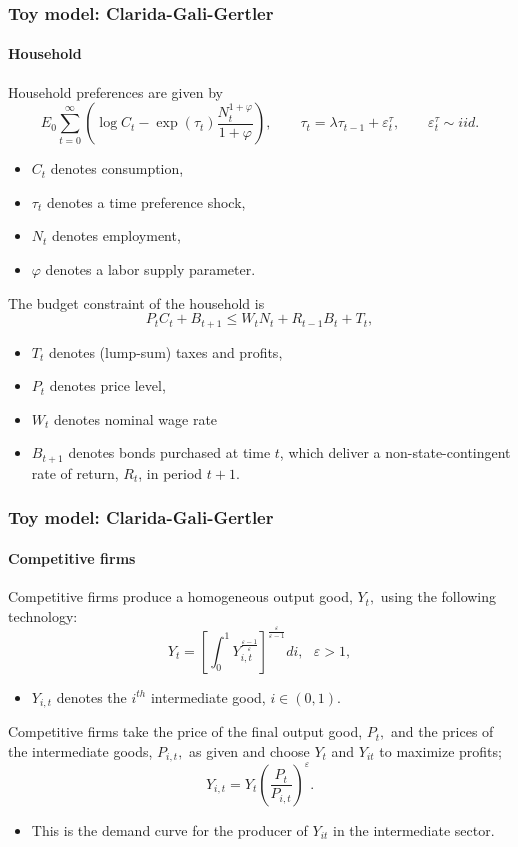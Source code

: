 \documentclass[handout]{beamer}  %
\begin{document}
\begin{frame}
  \frametitle{Toy model: Clarida-Gali-Gertler}\framesubtitle{Household}\footnotesize
Household preferences are given by
\begin{equation*}
E_{0}\sum_{t=0}^{\infty }\left( \log C_{t}-\exp \left( \tau _{t}\right)
\frac{N_{t}^{1+\varphi }}{1+\varphi }\right) ,\qquad \tau_{t}=\lambda \tau_{t-1}+\varepsilon_{t}^{\tau },\qquad \varepsilon_{t}^{\tau }\sim iid.
\end{equation*}
\begin{itemize}
\item $C_{t}$ denotes consumption,
\item $\tau_{t}$ denotes a time preference shock,
\item $N_{t}$ denotes employment,
\item $\varphi$ denotes a labor supply parameter.
\end{itemize}
The budget constraint of the household is
\begin{equation*}
  P_{t}C_{t}+B_{t+1}\leq W_{t}N_{t}+R_{t-1}B_{t}+T_{t},
\end{equation*}
\begin{itemize}
  \item $T_t$ denotes (lump-sum) taxes and profits,
  \item $P_t$ denotes price level,
  \item $W_t$ denotes nominal wage rate
  \item $B_{t+1}$ denotes bonds purchased at time $t$, which deliver a non-state-contingent rate of return, $R_{t}$, in period $t+1.$
\end{itemize}
\end{frame}

\begin{frame}    \frametitle{Toy model: Clarida-Gali-Gertler}\framesubtitle{Competitive firms}
Competitive firms produce a homogeneous output good, $Y_{t},$ using the following technology:
\[
Y_{t}=\left[ \int_{0}^{1}Y_{i,t}^{\frac{\varepsilon -1}{\varepsilon }}\right]
^{\frac{\varepsilon }{\varepsilon -1}}di,\text{ }\varepsilon >1,
\]%
\begin{itemize}
\item $Y_{i,t}$ denotes the $i^{th}$ intermediate good, $i\in \left(0,1\right).$
\end{itemize}
Competitive firms take the price of the final output good, $P_{t},$ and the prices of the intermediate goods, $P_{i,t},$ as given and choose $Y_{t}$ and $Y_{it}$ to maximize profits;
\[
Y_{i,t}=Y_{t}\left( \frac{P_{t}}{P_{i,t}}\right) ^{\varepsilon }.
\]%
\begin{itemize}
  \item This is the demand curve for the producer of $Y_{it}$ in the intermediate sector.
\end{itemize}
\end{frame}
\end{document}
